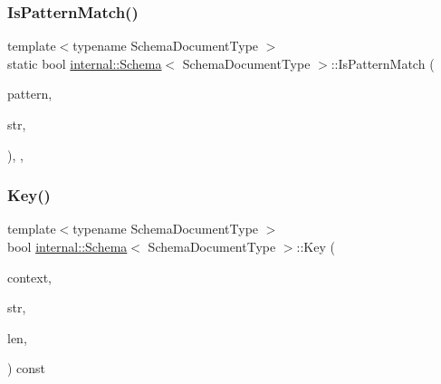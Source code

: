 \subsubsection{\texorpdfstring{Is\+Pattern\+Match()}{IsPatternMatch()}}
{\footnotesize\ttfamily template$<$typename Schema\+Document\+Type $>$ \\
static bool \hyperlink{classinternal_1_1Schema}{internal\+::\+Schema}$<$ Schema\+Document\+Type $>$\+::Is\+Pattern\+Match (\begin{DoxyParamCaption}\item[{const \hyperlink{classinternal_1_1Schema_a78fd42fda3cecdad0ee56559b4e3cec6}{Regex\+Type} $\ast$}]{pattern,  }\item[{const \hyperlink{classinternal_1_1Schema_a98043fca39adbf8b42e7472e3d80d6fa}{Ch} $\ast$}]{str,  }\item[{\hyperlink{rapidjson_8h_a5ed6e6e67250fadbd041127e6386dcb5}{Size\+Type}}]{ }\end{DoxyParamCaption})\hspace{0.3cm}{\ttfamily [inline]}, {\ttfamily [static]}, {\ttfamily [private]}}

\mbox{\label{classinternal_1_1Schema_abdd4db48f1b6deb7881777ddc539709a}} 
\subsubsection{\texorpdfstring{Key()}{Key()}}
{\footnotesize\ttfamily template$<$typename Schema\+Document\+Type $>$ \\
bool \hyperlink{classinternal_1_1Schema}{internal\+::\+Schema}$<$ Schema\+Document\+Type $>$\+::Key (\begin{DoxyParamCaption}\item[{\hyperlink{classinternal_1_1Schema_ac3f54abfefe300c5610c1205869cfd66}{Context} \&}]{context,  }\item[{const \hyperlink{classinternal_1_1Schema_a98043fca39adbf8b42e7472e3d80d6fa}{Ch} $\ast$}]{str,  }\item[{\hyperlink{rapidjson_8h_a5ed6e6e67250fadbd041127e6386dcb5}{Size\+Type}}]{len,  }\item[{bool}]{ }\end{DoxyParamCaption}) const\hspace{0.3cm}{\ttfamily [inline]}}

\mbox{\label{classinternal_1_1Schema_acd4fa9c33c9ef22a26ba160fdc1d78da}} 
